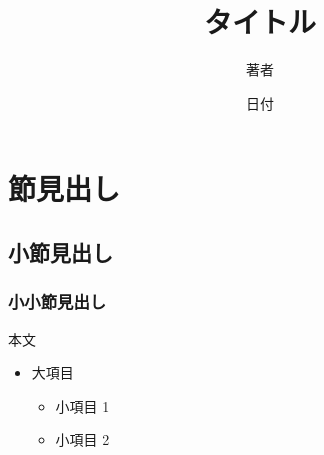 \documentclass[uplatex]{jsarticle}
\title{タイトル}
\author{著者}
\date{日付}
\begin{document}
\maketitle

\section{節見出し}
\subsection{小節見出し}
\subsubsection{小小節見出し}
本文
\begin{itemize}
  \item 大項目
  \begin{itemize}
    \item 小項目 1
    \item 小項目 2
  \end{itemize}
\end{itemize}
\end{document}
